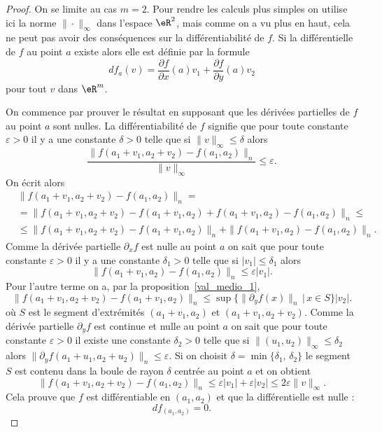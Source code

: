 \begin{proof}
    On se limite au cas $m=2$.  Pour rendre les calculs plus simples on utilise ici la norme $\|\cdot\|_\infty$ dans l'espace $\eR^2$, mais comme on a vu plus en haut, cela ne peut pas avoir des conséquences sur la différentiabilité de $f$. Si la différentielle de $f$ au point $a$ existe alors elle est définie par la formule
    \[
        df_a(v)=\frac{ \partial f }{ \partial x }(a)v_1+\frac{ \partial f }{ \partial y }(a)v_2
    \]
    pour tout $v$ dans $\eR^m$.

    On commence par prouver le résultat en supposant que les dérivées partielles de $f$ au point $a$ sont nulles. La différentiabilité de $f$ signifie que pour toute constante  $\varepsilon> 0$ il y a une constante $\delta>0$ telle que si $\|v\|_\infty\leq \delta $ alors
    \[
    \frac{\|f(a_1+v_1, a_2+v_2)-f(a_1, a_2)\|_n}{\|v\|_\infty}\leq \varepsilon.
    \]
    On écrit alors
    \begin{equation}
      \begin{aligned}
       & \|f(a_1+v_1, a_2+v_2)-f(a_1, a_2)\|_n=\\
    &=\|f(a_1+v_1, a_2+v_2)-f(a_1+v_1, a_2)+f(a_1+v_1, a_2)-f(a_1, a_2)\|_n\leq\\
    &\leq \|f(a_1+v_1, a_2+v_2)-f(a_1+v_1, a_2)\|_n+\|f(a_1+v_1, a_2)-f(a_1, a_2)\|_n.
      \end{aligned}
    \end{equation}
    Comme la dérivée partielle $\partial_x f$ est nulle au point $a$  on sait que  pour toute constante  $\varepsilon> 0$ il y a une constante $\delta_1>0$ telle que si $|v_1|\leq \delta_1 $ alors
    \[
    \|f(a_1+v_1, a_2)-f(a_1, a_2)\|_n\leq \varepsilon |v_1|.
    \]
    Pour l'autre terme on a, par la proposition~\ref{val_medio_1},
    \begin{equation}
       \|f(a_1+v_1, a_2+v_2)-f(a_1+v_1, a_2)\|_n\leq \sup\{\|\partial_yf(x)\|_n\,\vert\, x\in S\}|v_2|.
    \end{equation}
    où $S$ est le segment d'extrémités  $(a_1+v_1, a_2)$ et $ (a_1+v_1, a_2+v_2)$. Comme la  dérivée partielle $\partial_y f$ est continue et nulle au point $a$ on sait que  pour toute constante  $\varepsilon> 0$ il existe une constante $\delta_2>0$ telle que si $\|(u_1,u_2)\|_\infty\leq \delta_2 $ alors $\|\partial_yf(a_1+u_1,a_2+u_2)\|_n\leq \varepsilon$. Si on choisit $\delta = \min\{\delta_1,\,\delta_2\}$ le segment $S$ est contenu dans la boule de rayon $\delta$ centrée au point $a$ et on obtient
    \[
     \|f(a_1+v_1, a_2+v_2)-f(a_1, a_2)\|_n\leq \varepsilon |v_1|+\varepsilon |v_2|\leq 2\varepsilon \|v\|_\infty.
    \]
    Cela prouve que \( f\) est différentiable en \( (a_1,a_2)\) et que la différentielle est nulle :
    \begin{equation}
        df_{(a_1,a_2)}=0.
    \end{equation}


\end{proof}
